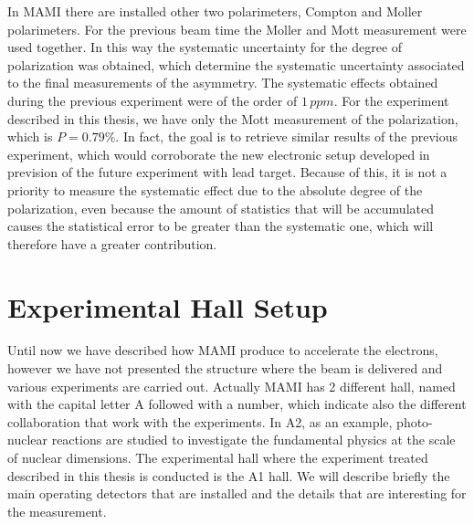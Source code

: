 In MAMI there are installed other two polarimeters, Compton and Moller polarimeters. For the previous beam time \cite{Esser:2018vdp} the Moller and Mott measurement were used together. In this way the systematic uncertainty for the degree of polarization was obtained, which determine the systematic uncertainty associated to the final measurements of the asymmetry. The systematic effects obtained during the previous experiment were of the order of $1 \, ppm$. For the experiment described in this thesis, we have only the Mott measurement of the polarization, which is $P = 0.79\%$. In fact, the goal is to retrieve similar results of the previous experiment, which would corroborate the new electronic setup developed in prevision of the future experiment with lead target. Because of this, it is not a priority to measure the systematic effect due to the absolute degree of the polarization, even because the amount of statistics that will be accumulated causes the statistical error to be greater than the systematic one, 
which will therefore have a greater contribution.

\newpage
\section{Experimental Hall Setup}


Until now we have described how MAMI produce to accelerate the electrons, however we have not presented the structure where the beam is delivered and various experiments are carried out.
Actually MAMI has 2 different hall, named with the capital letter A followed with a number, which indicate also the different collaboration that work with the experiments. In A2, as an example, photo-nuclear reactions are studied to investigate the fundamental physics at the scale of nuclear dimensions. The experimental hall where the experiment treated described in this thesis is conducted is the A1 hall. We will describe briefly the main operating detectors that are installed and the details that are interesting for the \transv  measurement. 

